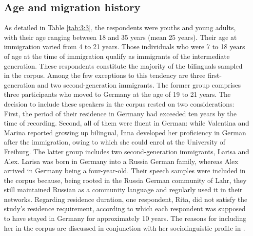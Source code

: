 \subsection{Age and migration history}
As detailed in Table \ref{tab:3:3}, the respondents were youths and young adults, with their age ranging between 18 and 35 years (mean 25 years). Their age at immigration varied from 4 to 21 years. Those individuals who were 7 to 18 years of age at the time of immigration qualify as immigrants of the intermediate generation. These respondents constitute the majority of the bilinguals sampled in the corpus. Among the few exceptions to this tendency are three first-generation and two second-generation immigrants. The former group comprises three participants who moved to Germany at the age of 19 to 21 years. The decision to include these speakers in the corpus rested on two considerations: First, the period of their residence in Germany had exceeded ten years by the time of recording. Second, all of them were fluent in German: while Valentina and Marina reported growing up bilingual, Inna developed her proficiency in German after the immigration, owing to which she could enrol at the University of Freiburg. The latter group includes two second-generation immigrants, Larisa and Alex. Larisa was born in Germany into a Russia German family, whereas Alex arrived in Germany being a four-year-old. Their speech samples were included in the corpus because, being rooted in the Russia German community of Lahr, they still maintained Russian as a community language and regularly used it in their networks. Regarding residence duration, one respondent, Rita, did not satisfy the study's residence requirement, according to which each respondent was supposed to have stayed in Germany for approximately 10 years. The reasons for including her in the corpus are discussed in conjunction with her sociolinguistic profile in .




